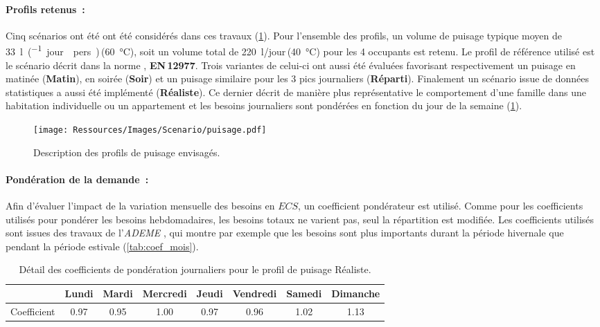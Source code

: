 \paragraph{Profils retenus~:} %
\label{par:profils_retenus}
Cinq scénarios ont été ont été considérés dans ces travaux (\ref{fig:profil_puisage}).
Pour l’ensemble des profils, un volume de puisage typique moyen de
\SI{33}{\litre\per(jour\period pers)}\,(\SI{60}{\celsius}), soit un
volume total de \SI{220}{\litre/jour}\,(\SI{40}{\celsius}) pour les 4 occupants est
retenu. Le profil de référence utilisé est le scénario décrit dans la norme
\textcite{EN129771}, \textbf{EN\,12977}. Trois variantes de celui-ci ont aussi été évaluées favorisant
respectivement un puisage en matinée (\textbf{Matin}), en soirée (\textbf{Soir}) et un
puisage similaire pour les 3 pics journaliers (\textbf{Réparti}). Finalement un scénario
issue de données statistiques \parencite{ADEME2016} a aussi été implémenté
(\textbf{Réaliste}). Ce dernier décrit de manière plus représentative le comportement
d’une famille dans une habitation individuelle ou un appartement et les besoins
journaliers sont pondérées en fonction du jour de la semaine (\ref{tab:coef_semaine}).
\begin{figure}
    \begin{center}
        \texttt{[image: Ressources/Images/Scenario/puisage.pdf]}
    \end{center}
    \caption{Description des profils de puisage envisagés.
             \label{fig:profil_puisage}}
\end{figure}

\paragraph{Pondération de la demande~:} %
\label{par:ponderation_de_la_demande}
Afin d’évaluer l’impact de la variation mensuelle des besoins en $ECS$, un
coefficient pondérateur est utilisé. Comme pour les coefficients utilisés pour pondérer
les besoins hebdomadaires, les besoins totaux ne varient pas, seul la répartition est
modifiée. Les coefficients utilisés sont issues des travaux de l’\emph{ADEME}
\parencite{ADEME2016}, qui montre par exemple que les besoins sont plus importants durant
la période hivernale que pendant la période estivale (\ref{tab:coef_mois}).

\begin{table}
\centering
\begin{tabular}{l*{7}{c}}
    \toprule
                & Lundi & Mardi & Mercredi & Jeudi & Vendredi & Samedi & Dimanche \\
    \midrule
    Coefficient & \num{0.97}  & \num{0.95}  & \num{1.00}     & \num{0.97}  & \num{0.96}     & \num{1.02}   & \num{1.13}     \\
    \bottomrule
\end{tabular}
\caption{Détail des coefficients de pondération journaliers pour le profil de
         puisage Réaliste.}
         \label{tab:coef_semaine}
\end{table}

